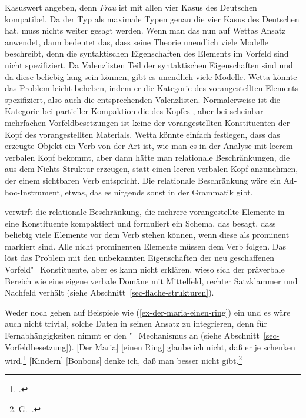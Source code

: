 \begin{exe}
\begin{xlist}
Kasuswert angeben, denn \emph{Frau} ist mit allen vier Kasus des Deutschen kompatibel. Da der Typ
 als maximale Typen genau die vier Kasus des Deutschen hat, muss nichts weiter gesagt
werden. Wenn man das nun auf Wettas Ansatz anwendet, dann bedeutet das, dass seine Theorie unendlich
viele Modelle beschreibt, denn die syntaktischen Eigenschaften des Elements im Vorfeld sind nicht
spezifiziert. Da Valenzlisten Teil der syntaktischen Eigenschaften sind und da diese beliebig lang
sein können, gibt es unendlich viele Modelle. Wetta könnte das Problem leicht beheben, indem er
die Kategorie des vorangestellten Elements spezifiziert, also auch die entsprechenden Valenzlisten.
Normalerweise ist die Kategorie bei partieller Kompaktion die des Kopfes
\parencites[178]{KP95a}[101]{Kathol2001a}{Babel}[244]{Mueller99a}, aber bei scheinbar mehrfachen
Vorfeldbesetzungen ist keine der vorangestellten Konstituenten der Kopf des vorangestellten Materials.
Wetta könnte einfach festlegen, dass das erzeugte Objekt ein Verb von der Art ist, wie man es in der
Analyse mit leerem verbalen Kopf bekommt, aber dann hätte man relationale Beschränkungen, die aus
dem Nichts Struktur erzeugen, statt einen leeren verbalen Kopf anzunehmen, der einem sichtbaren Verb
entspricht. Die relationale Beschränkung wäre ein Ad-hoc-Instrument, etwas, das es nirgends sonst in
der Grammatik gibt.

\citet[Abschnitt~5.4.6]{Wetta2014a-u} verwirft die relationale Beschränkung, die mehrere
vorangestellte Elemente in eine Konstituente kompaktiert und formuliert ein Schema, das besagt, dass
beliebig viele Elemente vor dem Verb stehen können, wenn diese als prominent markiert sind. Alle
nicht prominenten Elemente müssen dem Verb folgen. Das löst das Problem mit den unbekannten
Eigenschaften der neu geschaffenen Vorfeld"=Konstituente, aber es kann nicht erklären, wieso sich
der präverbale Bereich wie eine eigene verbale Domäne mit Mittelfeld, rechter Satzklammer und
Nachfeld verhält (siehe Abschnitt~\ref{sec-flache-strukturen}).

Weder \citet{Wetta2011a} noch  gehen auf Beispiele wie
(\ref{ex-der-maria-einen-ring}) ein und es wäre auch nicht trivial, solche Daten in seinen Ansatz zu
integrieren, denn für Fernabhängigkeiten nimmt er den \slasch"=Mechanismus an (siehe Abschnitt~\ref{sec-Vorfeldbesetzung}).
\eal
\label{ex-der-maria-einen-ring}
\ex {}[Der Maria] [einen Ring] glaube ich nicht, daß er je schenken wird.\footnote{
.
}
\ex {}[Kindern] [Bonbons] denke ich, daß  man besser nicht gibt.\footnote{
        G.\ .
}
\zl


\end{xlist}
\end{exe}
